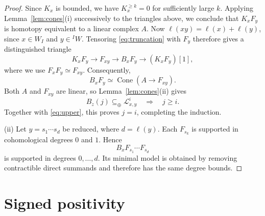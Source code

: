 \documentclass[11pt,a4paper]{article}
\numberwithin{equation}{section}
\theoremstyle{remark}
\newcommand{\LL}{\mathcal L}
\newcommand{\Cone}{\operatorname{Cone}}
\newcommand{\summand}{\mathrel{\subseteq_{\oplus}}}
\begin{document}
\begin{proof}
	Since $K_x$ is bounded, we have
	$K_x^{\ge k}=0$ for sufficiently large $k$.
	Applying Lemma~\ref{lem:cones}(i) successively
	to the triangles above, we conclude that
	$K_xF_y$ is homotopy equivalent to a linear
	complex $A$. Now $\ell(xy)=\ell(x)+\ell(y)$, since
	$x\in W_I$ and $y\in{}^I W$.
	Tensoring \eqref{eq:truncation} with $F_y$
	therefore gives a distinguished triangle
	\[
	K_xF_y\longrightarrow F_{xy}
	\longrightarrow B_xF_y
	\longrightarrow (K_xF_y)[1],
	\]
	where we use $F_xF_y\simeq F_{xy}$.
	Consequently,
	\[
	B_xF_y\simeq\Cone(A\to F_{xy}).
	\]
	Both $A$ and $F_{xy}$ are linear, so
	Lemma~\ref{lem:cones}(ii) gives
	\[
	B_z(j)\summand\LL_{x,y}^i
	\quad\Longrightarrow\quad j\ge i.
	\]
	Together with \eqref{eq:upper}, this proves
	$j=i$, completing the induction.
	
	(ii) Let $y=s_1\cdots s_d$ be reduced,
	where $d=\ell(y)$.
	Each $F_{s_k}$ is supported in cohomological
	degrees $0$ and $1$. Hence
	\[
	B_xF_{s_1}\cdots F_{s_d}
	\]
	is supported in degrees $0,\ldots,d$.
	Its minimal model is obtained by removing
	contractible direct summands and therefore
	has the same degree bounds.
\end{proof}


\section{Signed positivity}
\label{sec:positivity}
\end{document}
